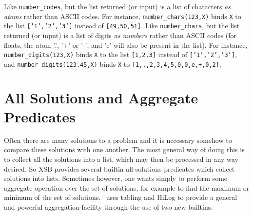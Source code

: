 \begin{description}
    Like \verb|number_codes|, but the list returned (or input) is a list of
    characters \emph{as atoms} rather than ASCII codes. For instance, 
    \verb|number_chars(123,X)| binds {\tt X} to the list {\tt ['1','2','3']}
    instead of {\tt [49,50,51]}.
    Like \verb|number_chars|, but the list returned (or input) is a list of
    digits \emph{as numbers} rather than ASCII codes (for floats, the atom
    '.', '+' or '-', and 'e' will also be present in the list). For instance, 
    \verb|number_digits(123,X)| binds {\tt X} to the list {\tt [1,2,3]}
    instead of {\tt ['1','2','3']}, and \verb|number_digits(123.45,X)|
    binds {\tt X} to {\tt [1,.,2,3,4,5,0,0,e,+,0,2]}.


\end{description}


\section{All Solutions and Aggregate Predicates}
 
Often there are many solutions to a problem and it is necessary
somehow to compare these solutions with one another.  The most general
way of doing this is to collect all the solutions into a list, which
may then be processed in any way desired.  So XSB provides several
builtin all-solutions predicates which collect solutions into lists.
Sometimes however, one wants simply to perform some aggregate
operation over the set of solutions, for example to find the maximum
or minimum of the set of solutions.  \ourprolog\ uses tabling and
HiLog to provide a general and powerful aggregation facility through
the use of two new builtins.


